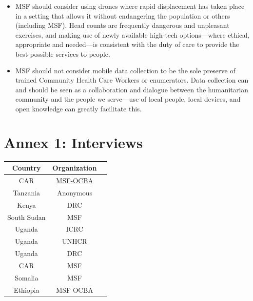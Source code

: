 \documentclass[a4paper,12pt,twoside]{article}
\begin{document}
\begin{itemize}
    \item MSF should consider using drones where rapid displacement has taken place in a setting that allows it without endangering the population or others (including MSF). Head counts are frequently dangerous and unpleasant exercises, and making use of newly available high-tech options---where ethical, appropriate and needed---is consistent with the duty of care to provide the best possible services to people.
    \item MSF should not consider mobile data collection to be the sole preserve of trained Community Health Care Workers or enumerators. Data collection can and should be seen as a collaboration and dialogue between the humanitarian community and the people we serve---use of local people, local devices, and open knowledge can greatly facilitate this. 
    
\end{itemize}

\section{Annex 1: Interviews}

\begin{center}
\begin{tabular}{|c|c|c|}  
 \hline
Country & Organization \\
\hline
CAR & \href{https://drive.google.com/open?id=1hKWbOf09AfBav2jGUfdhXv7ZLtpaG9QQRA_ePARLTn0}{MSF-OCBA} \\
\hline
Tanzania & Anonymous \\ 
\hline
Kenya & DRC \\
\hline
South Sudan	& MSF \\
\hline
Uganda & ICRC \\
\hline 
Uganda & UNHCR \\
\hline
Uganda & DRC \\
\hline
CAR & MSF \\
\hline
Somalia & MSF \\
\hline
Ethiopia & MSF OCBA \\
\hline
\end{tabular}
\end{center}
\end{document}
